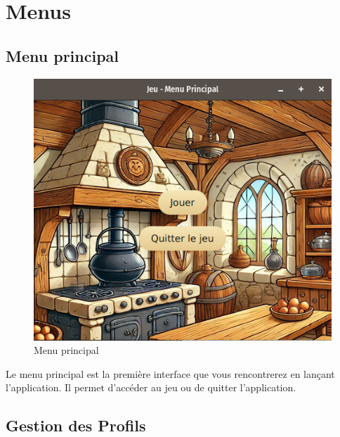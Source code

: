 \section{Menus}

\subsection{Menu principal}

\begin{figure}[h]
    \centering
    \includegraphics[width=18cm]{../Annexe/Screen/MenuPrincipale.png}
    \caption{Menu principal}
\end{figure}

Le menu principal est la première interface que vous rencontrerez en lançant l'application. Il permet d'accéder au jeu ou de quitter l'application.

\subsection{Gestion des Profils}

